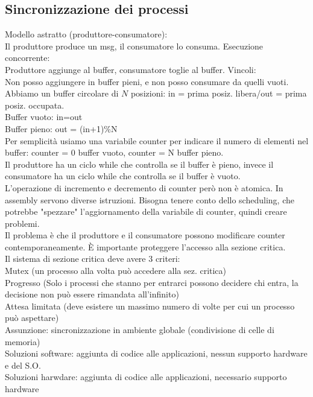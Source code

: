 \documentclass{article}
\begin{document}
\subsection*{Sincronizzazione dei processi}
Modello astratto (produttore-consumatore):\\
Il produttore produce un msg, il consumatore lo consuma. Esecuzione concorrente:\\
Produttore aggiunge al buffer, consumatore toglie al buffer. Vincoli:\\
Non posso aggiungere in buffer pieni, e non posso consumare da quelli vuoti.\\
Abbiamo un buffer circolare di $N$ posizioni: in = prima posiz. libera/out = prima posiz. occupata.\\
Buffer vuoto: in=out\\
Buffer pieno: out = (in+1)\%N\\
Per semplicit\`{a} usiamo una variabile counter per indicare il numero di elementi nel buffer: counter = 0
buffer vuoto, counter = N buffer pieno.\\
Il produttore ha un ciclo while che controlla se il buffer \`{e} pieno,
invece il consumatore ha un ciclo while che controlla se il buffer \`{e} vuoto.\\
L'operazione di incremento e decremento di counter per\`{o} non \`{e} atomica.
In assembly servono diverse istruzioni. Bisogna tenere conto dello scheduling, che potrebbe
"spezzare" l'aggiornamento della variabile di counter, quindi creare problemi.\\
Il problema \`{e} che il produttore e il consumatore possono modificare counter 
contemporaneamente. \`{E} importante proteggere l'accesso alla sezione
critica.\\
Il sistema di sezione critica deve avere 3 criteri:\\
Mutex (un processo alla volta pu\`{o} accedere alla sez. critica)\\
Progresso (Solo i processi che stanno per entrarci possono decidere chi entra, la decisione
non pu\`{o} essere rimandata all'infinito)\\
Attesa limitata (deve esistere un massimo numero di volte per cui un processo pu\`{o} aspettare)\\
Assunzione: sincronizzazione in ambiente globale (condivisione di celle di memoria)\\
Soluzioni software: aggiunta di codice alle applicazioni, nessun supporto hardware e del S.O.\\
Soluzioni harwdare: aggiunta di codice alle applicazioni, necessario supporto hardware
\end{document}
